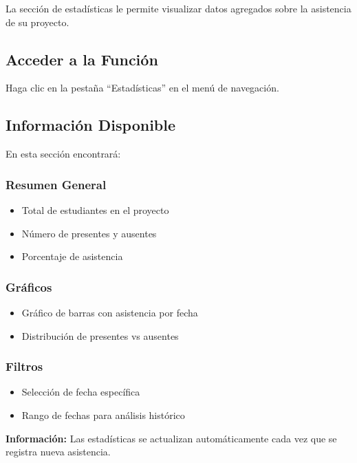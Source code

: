 \documentclass[11pt,a4paper]{article}
\begin{document}
La sección de estadísticas le permite visualizar datos agregados sobre la asistencia de su proyecto.

\subsection{Acceder a la Función}

Haga clic en la pestaña ``Estadísticas'' en el menú de navegación.

\subsection{Información Disponible}

En esta sección encontrará:

\subsubsection{Resumen General}
\begin{itemize}
  \item Total de estudiantes en el proyecto
  \item Número de presentes y ausentes
  \item Porcentaje de asistencia
\end{itemize}

\subsubsection{Gráficos}
\begin{itemize}
  \item Gráfico de barras con asistencia por fecha
  \item Distribución de presentes vs ausentes
\end{itemize}

\subsubsection{Filtros}
\begin{itemize}
  \item Selección de fecha específica
  \item Rango de fechas para análisis histórico
\end{itemize}

\begin{infobox}
\textbf{Información:} Las estadísticas se actualizan automáticamente cada vez que se registra nueva asistencia.
\end{infobox}
\end{document}
